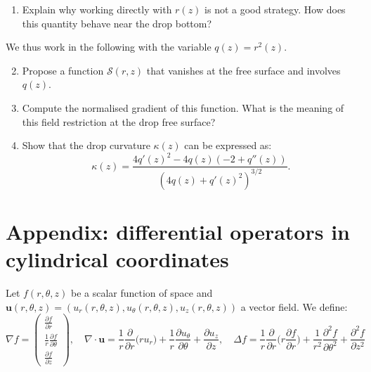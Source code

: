 \documentclass[11pt,a4paper]{article}
\begin{document}
\begin{enumerate}
\item Explain why working directly with $r(z)$ is not a good strategy. How does this quantity behave near the drop bottom?
\end{enumerate}
We thus work in the following with the variable $q(z) = r^2(z)$.
\begin{enumerate}
\setcounter{enumi}{1}
\item Propose a function $\mathcal S(r,z)$ that vanishes at the free surface and involves $q(z)$.
\item Compute the normalised gradient of this function. What is the meaning of this field restriction at the drop free surface?
\item Show that the drop curvature $\kappa(z)$ can be expressed as:
\begin{equation}
\kappa(z) = \frac{4 q'(z)^2 - 4q(z) (-2 + q''(z))}{(4 q(z)+q'(z)^2)^{3/2}}.
\end{equation}
\end{enumerate}

\section*{Appendix: differential operators in cylindrical coordinates}
\noindent Let $f(r,\theta,z)$ be a scalar function of space and $\boldsymbol{u}(r,\theta,z) = (u_r(r,\theta,z), u_\theta(r,\theta,z), u_z(r,\theta,z))$ a vector field. We define:
\begin{equation*}
\nabla f = \left(
\begin{array}{c}
\displaystyle\frac{\partial f}{\partial r}\\[1em]
\displaystyle\frac{1}{r}\frac{\partial f}{\partial \theta}\\[1em]
\displaystyle\frac{\partial f}{\partial z}
\end{array}
\right), 
\quad \nabla \cdot \boldsymbol{u} = \frac{1}{r} \frac{\partial}{\partial r}\bigg( r u_r\bigg) + \frac{1}{r} \frac{\partial u_\theta}{\partial \theta} + \frac{\partial u_z}{\partial z},
\quad \Delta f = \frac{1}{r} \frac{\partial}{\partial r}\bigg( r \frac{\partial f}{\partial r}\bigg) + \frac{1}{r^2} \frac{\partial^2 f}{\partial \theta^2} + \frac{\partial^2 f}{\partial z^2}
\end{equation*}



\end{document}
